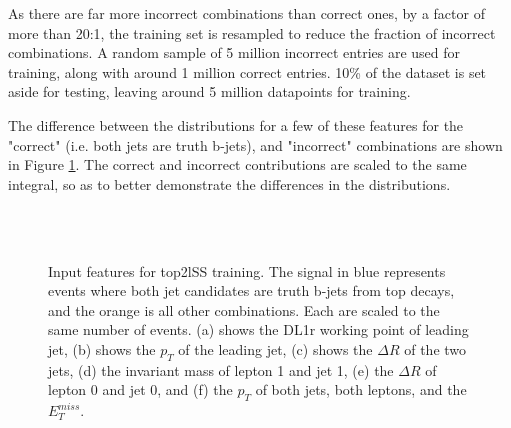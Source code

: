 As there are far more incorrect combinations than correct ones, by a factor of more than 20:1, the training set is resampled to reduce the fraction of incorrect combinations. A random sample of 5 million incorrect entries are used for training, along with around 1 million correct entries. 10\% of the dataset is set aside for testing, leaving around 5 million datapoints for training. 

The difference between the distributions for a few of these features for the "correct" (i.e. both jets are truth b-jets), and "incorrect" combinations are shown in Figure \ref{fig:features_top2lSS}. The correct and incorrect contributions are scaled to the same integral, so as to better demonstrate the differences in the distributions.

\begin{figure}[H]
    \centering
    \\
    \\
    \caption{Input features for top2lSS training. The signal in blue represents events where both jet candidates are truth b-jets from top decays, and the orange is all other combinations. Each are scaled to the same number of events. (a) shows the DL1r working point of leading jet, (b) shows the $p_T$ of the leading jet, (c) shows the $\Delta R$ of the two jets, (d) the invariant mass of lepton 1 and jet 1, (e) the $\Delta R$ of lepton 0 and jet 0, and (f) the $p_T$ of both jets, both leptons, and the $E_T^{miss}$.}
    \label{fig:features_top2lSS}                                                                                        
\end{figure}


